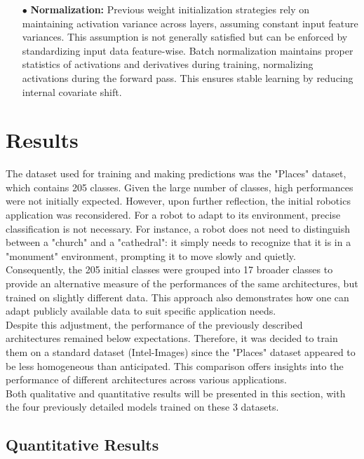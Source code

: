 \documentclass[twocolumn,superscriptaddress,aps]{revtex4-1}
\begin{document}
\begin{itemize}
    \item[$\bullet$] \textbf{Normalization:} Previous weight initialization strategies rely on maintaining activation variance across layers, assuming constant input feature variances. This assumption is not generally satisfied but can be enforced by standardizing input data feature-wise. Batch normalization maintains proper statistics of activations and derivatives during training, normalizing activations during the forward pass. This ensures stable learning by reducing internal covariate shift.
\end{itemize}


\section{Results}

The dataset used for training and making predictions was the "Places" dataset, which contains 205 classes. Given the large number of classes, high performances were not initially expected. However, upon further reflection, the initial robotics application was reconsidered. For a robot to adapt to its environment, precise classification is not necessary. For instance, a robot does not need to distinguish between a "church" and a "cathedral": it simply needs to recognize that it is in a "monument" environment, prompting it to move slowly and quietly.\\

Consequently, the 205 initial classes were grouped into 17 broader classes to provide an alternative measure of the performances of the same architectures, but trained on slightly different data. This approach also demonstrates how one can adapt publicly available data to suit specific application needs.\\

Despite this adjustment, the performance of the previously described architectures remained below expectations. Therefore, it was decided to train them on a standard dataset (Intel-Images) since the "Places" dataset appeared to be less homogeneous than anticipated. This comparison offers insights into the performance of different architectures across various applications.\\

Both qualitative and quantitative results will be presented in this section, with the four previously detailed models trained on these 3 datasets. 

\subsection{Quantitative Results}
\end{document}
